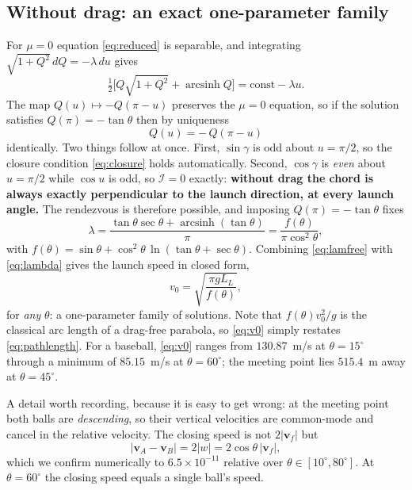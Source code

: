 \documentclass[aip,amsmath,amssymb,preprint,floatfix]{revtex4-2}
\newcommand{\LL}{L_{L}}
\newcommand{\vv}{\bm{v}}
\begin{document}
\subsection{Without drag: an exact one-parameter family}

For $\mu=0$ equation \eqref{eq:reduced} is separable, and integrating
$\sqrt{1+Q^2}\,dQ=-\lambda\,du$ gives
\begin{equation}
\tfrac12\bigl[Q\sqrt{1+Q^2}+\operatorname{arcsinh}Q\bigr]
 = \text{const} - \lambda u .
\end{equation}
The map $Q(u)\mapsto -Q(\pi-u)$ preserves the $\mu=0$ equation, so if the solution
satisfies $Q(\pi)=-\tan\theta$ then by uniqueness
\begin{equation}
Q(u) = -\,Q(\pi-u)
\label{eq:antisym}
\end{equation}
identically. Two things follow at once. First, $\sin\gamma$ is odd about $u=\pi/2$,
so the closure condition \eqref{eq:closure} holds automatically. Second,
$\cos\gamma$ is \emph{even} about $u=\pi/2$ while $\cos u$ is odd, so
$\mathcal{I}=0$ exactly: \textbf{without drag the chord is always exactly
perpendicular to the launch direction, at every launch angle.} The rendezvous is
therefore possible, and imposing $Q(\pi)=-\tan\theta$ fixes
\begin{equation}
\lambda = \frac{\tan\theta\sec\theta+\operatorname{arcsinh}(\tan\theta)}{\pi}
        = \frac{f(\theta)}{\pi\cos^2\theta},
\label{eq:lamfree}
\end{equation}
with $f(\theta)=\sin\theta+\cos^2\theta\,\ln(\tan\theta+\sec\theta)$. Combining
\eqref{eq:lamfree} with \eqref{eq:lambda} gives the launch speed in closed form,
\begin{equation}
v_0 = \sqrt{\frac{\pi g \LL}{f(\theta)}} ,
\label{eq:v0}
\end{equation}
for \emph{any} $\theta$: a one-parameter family of solutions. Note that
$f(\theta)v_0^2/g$ is the classical arc length of a drag-free parabola, so
\eqref{eq:v0} simply restates \eqref{eq:pathlength}. For a baseball, \eqref{eq:v0}
ranges from $130.87$~m/s at $\theta=15^\circ$ through a minimum of $85.15$~m/s at
$\theta=60^\circ$; the meeting point lies $515.4$~m away at $\theta=45^\circ$.

A detail worth recording, because it is easy to get wrong: at the meeting point both
balls are \emph{descending}, so their vertical velocities are common-mode and cancel
in the relative velocity. The closing speed is not $2|\vv_f|$ but
\begin{equation}
|\vv_A-\vv_B| = 2|w| = 2\cos\theta\,|\vv_f| ,
\end{equation}
which we confirm numerically to $6.5\times10^{-11}$ relative over
$\theta\in[10^\circ,80^\circ]$. At $\theta=60^\circ$ the closing speed equals a single
ball's speed.
\end{document}
